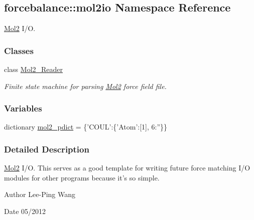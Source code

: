 \hypertarget{namespaceforcebalance_1_1mol2io}{\subsection{forcebalance\-:\-:mol2io \-Namespace \-Reference}
\label{namespaceforcebalance_1_1mol2io}
}


\hyperlink{namespaceforcebalance_1_1Mol2}{\-Mol2} \-I/\-O.  


\subsubsection*{\-Classes}
\begin{DoxyCompactItemize}
\item 
class \hyperlink{classforcebalance_1_1mol2io_1_1Mol2__Reader}{\-Mol2\-\_\-\-Reader}
\begin{DoxyCompactList}\small\item\em \-Finite state machine for parsing \hyperlink{namespaceforcebalance_1_1Mol2}{\-Mol2} force field file. \end{DoxyCompactList}\end{DoxyCompactItemize}
\subsubsection*{\-Variables}
\begin{DoxyCompactItemize}
\item 
dictionary \hyperlink{namespaceforcebalance_1_1mol2io_af0073414a586dd18be75a1691b7e0ced}{mol2\-\_\-pdict} = \{'\-C\-O\-U\-L'\-:\{'\-Atom'\-:\mbox{[}1\mbox{]}, 6\-:''\}\}
\end{DoxyCompactItemize}


\subsubsection{\-Detailed \-Description}
\hyperlink{namespaceforcebalance_1_1Mol2}{\-Mol2} \-I/\-O. \-This serves as a good template for writing future force matching \-I/\-O modules for other programs because it's so simple.

\begin{DoxyAuthor}{\-Author}
\-Lee-\/\-Ping \-Wang 
\end{DoxyAuthor}
\begin{DoxyDate}{\-Date}
05/2012 
\end{DoxyDate}


